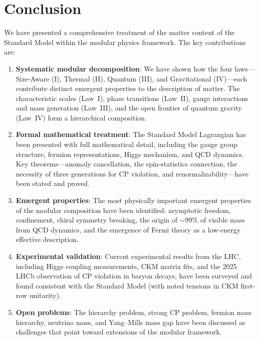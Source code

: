 \documentclass[12pt]{article}
\theoremstyle{definition}
\theoremstyle{remark}
\begin{document}
\section{Conclusion}
\label{sec:conclusion}

We have presented a comprehensive treatment of the matter content of the Standard Model within the modular physics framework. The key contributions are:

\begin{enumerate}
    \item \textbf{Systematic modular decomposition}: We have shown how the four laws---Size-Aware (I), Thermal (II), Quantum (III), and Gravitational (IV)---each contribute distinct emergent properties to the description of matter. The characteristic scales (Law~I), phase transitions (Law~II), gauge interactions and mass generation (Law~III), and the open frontier of quantum gravity (Law~IV) form a hierarchical composition.

    \item \textbf{Formal mathematical treatment}: The Standard Model Lagrangian has been presented with full mathematical detail, including the gauge group structure, fermion representations, Higgs mechanism, and QCD dynamics. Key theorems---anomaly cancellation, the spin-statistics connection, the necessity of three generations for CP violation, and renormalizability---have been stated and proved.

    \item \textbf{Emergent properties}: The most physically important emergent properties of the modular composition have been identified: asymptotic freedom, confinement, chiral symmetry breaking, the origin of $\sim 99\%$ of visible mass from QCD dynamics, and the emergence of Fermi theory as a low-energy effective description.

    \item \textbf{Experimental validation}: Current experimental results from the LHC, including Higgs coupling measurements, CKM matrix fits, and the 2025 LHCb observation of CP violation in baryon decays, have been surveyed and found consistent with the Standard Model (with noted tensions in CKM first-row unitarity).

    \item \textbf{Open problems}: The hierarchy problem, strong CP problem, fermion mass hierarchy, neutrino mass, and Yang--Mills mass gap have been discussed as challenges that point toward extensions of the modular framework.
\end{enumerate}
\end{document}
